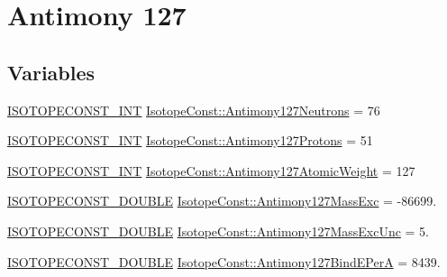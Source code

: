 \hypertarget{group___isotope_const-_antimony-_sb127}{}\section{Antimony 127}
\label{group___isotope_const-_antimony-_sb127}
\subsection*{Variables}
\begin{DoxyCompactItemize}
\item 
\mbox{\hyperlink{group___isotope_const-_macros_ga5f18360b3e99483a35c32d789e62621c}{I\+S\+O\+T\+O\+P\+E\+C\+O\+N\+S\+T\+\_\+\+I\+NT}} \mbox{\hyperlink{group___isotope_const-_antimony-_sb127_ga3d56ec64ee00e1b0c030ad5a92e07c41}{Isotope\+Const\+::\+Antimony127\+Neutrons}} = 76
\item 
\mbox{\hyperlink{group___isotope_const-_macros_ga5f18360b3e99483a35c32d789e62621c}{I\+S\+O\+T\+O\+P\+E\+C\+O\+N\+S\+T\+\_\+\+I\+NT}} \mbox{\hyperlink{group___isotope_const-_antimony-_sb127_ga804fdf61b773f1cf23ca90e342ffe2a3}{Isotope\+Const\+::\+Antimony127\+Protons}} = 51
\item 
\mbox{\hyperlink{group___isotope_const-_macros_ga5f18360b3e99483a35c32d789e62621c}{I\+S\+O\+T\+O\+P\+E\+C\+O\+N\+S\+T\+\_\+\+I\+NT}} \mbox{\hyperlink{group___isotope_const-_antimony-_sb127_gaf093b7ed2338ee4a404bff063b7382b4}{Isotope\+Const\+::\+Antimony127\+Atomic\+Weight}} = 127
\item 
\mbox{\hyperlink{group___isotope_const-_macros_ga8f45a7272ce02c0b4c65c44636ed719a}{I\+S\+O\+T\+O\+P\+E\+C\+O\+N\+S\+T\+\_\+\+D\+O\+U\+B\+LE}} \mbox{\hyperlink{group___isotope_const-_antimony-_sb127_ga0b531032effddab1e20d02c0e77b1d83}{Isotope\+Const\+::\+Antimony127\+Mass\+Exc}} = -\/86699.
\item 
\mbox{\hyperlink{group___isotope_const-_macros_ga8f45a7272ce02c0b4c65c44636ed719a}{I\+S\+O\+T\+O\+P\+E\+C\+O\+N\+S\+T\+\_\+\+D\+O\+U\+B\+LE}} \mbox{\hyperlink{group___isotope_const-_antimony-_sb127_ga0af72722e1e10e6b16acd553966ddadb}{Isotope\+Const\+::\+Antimony127\+Mass\+Exc\+Unc}} = 5.
\item 
\mbox{\hyperlink{group___isotope_const-_macros_ga8f45a7272ce02c0b4c65c44636ed719a}{I\+S\+O\+T\+O\+P\+E\+C\+O\+N\+S\+T\+\_\+\+D\+O\+U\+B\+LE}} \mbox{\hyperlink{group___isotope_const-_antimony-_sb127_ga0d714d314964aebd02fa2fb4ca6f49a0}{Isotope\+Const\+::\+Antimony127\+Bind\+E\+PerA}} = 8439.
\item 

\end{DoxyCompactItemize}
